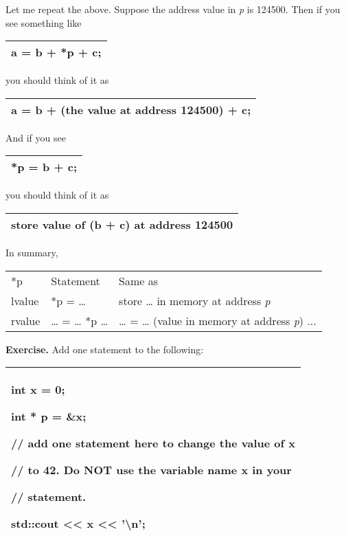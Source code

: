 \documentclass[
]{article}
\begin{document}
Let me repeat the above. Suppose the address value in \emph{p} is
124500. Then if you see something like

\begin{longtable}[]{@{}l@{}}
\toprule
\endhead
a = b + *p + c;\tabularnewline
\bottomrule
\end{longtable}

you should think of it as

\begin{longtable}[]{@{}l@{}}
\toprule
\endhead
a = b + (the value at address 124500) + c;\tabularnewline
\bottomrule
\end{longtable}

And if you see

\begin{longtable}[]{@{}l@{}}
\toprule
\endhead
*p = b + c;\tabularnewline
\bottomrule
\end{longtable}

you should think of it as

\begin{longtable}[]{@{}l@{}}
\toprule
\endhead
store value of (b + c) at address 124500\tabularnewline
\bottomrule
\end{longtable}

In summary,

\begin{longtable}[]{@{}lll@{}}
\toprule
\endhead
*p & Statement & Same as\tabularnewline
lvalue & *p = \ldots{} & store \ldots{} in memory at address
\emph{p}\tabularnewline
rvalue & \ldots{} = \ldots{} *p \ldots{} & \ldots{} = \ldots{} (value in
memory at address \emph{p}) ...\tabularnewline
\bottomrule
\end{longtable}

\textbf{Exercise.} Add one statement to the following:

\begin{longtable}[]{@{}l@{}}
\toprule
\endhead
\begin{minipage}[t]{0.97\columnwidth}\raggedright
int x = 0;

int * p = \&x;

// add one statement here to change the value of x

// to 42. Do NOT use the variable name x in your

// statement.

std::cout \textless\textless{} x \textless\textless{}
'\textbackslash n';\strut
\end{minipage}\tabularnewline
\bottomrule
\end{longtable}
\end{document}
